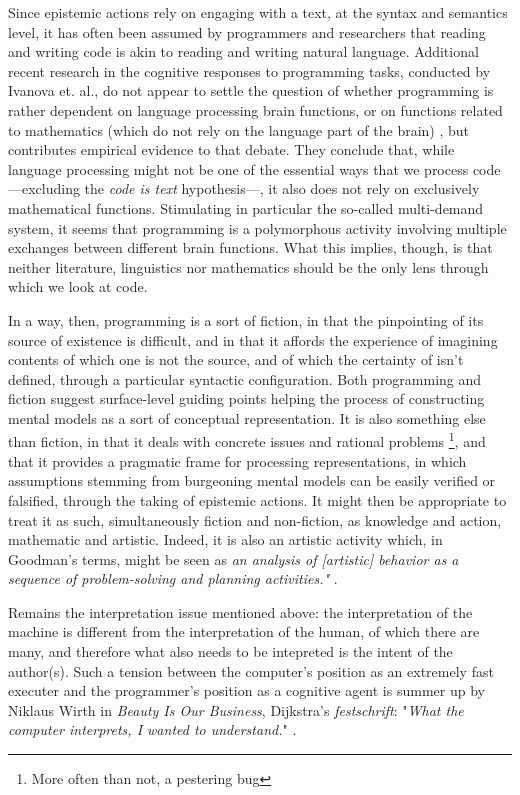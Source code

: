 Since epistemic actions rely on engaging with a text, at the syntax and semantics level, it has often been assumed by programmers and researchers that reading and writing code is akin to reading and writing natural language. Additional recent research in the cognitive responses to programming tasks, conducted by Ivanova et. al., do not appear to settle the question of whether programming is rather dependent on language processing brain functions, or on functions related to mathematics (which do not rely on the language part of the brain) \citep{ivanova_comprehension_2020}, but contributes empirical evidence to that debate. They conclude that, while language processing might not be one of the essential ways that we process code—excluding the \emph{code is text} hypothesis—, it also does not rely on exclusively mathematical functions. Stimulating in particular the so-called multi-demand system, it seems that programming is a polymorphous activity involving multiple exchanges between different brain functions. What this implies, though, is that neither literature, linguistics nor mathematics should be the only lens through which we look at code.

In a way, then, programming is a sort of fiction, in that the pinpointing of its source of existence is difficult, and in that it affords the experience of imagining contents of which one is not the source, and of which the certainty of isn't defined, through a particular syntactic configuration. Both programming and fiction suggest surface-level guiding points helping the process of constructing mental models as a sort of conceptual representation. It is also something else than fiction, in that it deals with concrete issues and rational problems \footnote{More often than not, a pestering bug}, and that it provides a pragmatic frame for processing representations, in which assumptions stemming from burgeoning mental models can be easily verified or falsified, through the taking of epistemic actions. It might then be appropriate to treat it as such, simultaneously fiction and non-fiction, as knowledge and action, mathematic and artistic. Indeed, it is also an artistic activity which, in Goodman's terms, might be seen as \emph{an analysis of [artistic] behavior as a sequence of problem-solving and planning activities."} \citep{goodman_basic_1972}.

Remains the interpretation issue mentioned above: the interpretation of the machine is different from the interpretation of the human, of which there are many, and therefore what also needs to be intepreted is the intent of the author(s). Such a tension between the computer's position as an extremely fast executer and the programmer's position as a cognitive agent is summer up by Niklaus Wirth in \emph{Beauty Is Our Business}, Dijkstra's \emph{festschrift}: "\emph{What the computer interprets, I wanted to understand.}" \citep{wirth_drawing_1990}.

